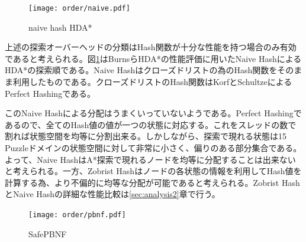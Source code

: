 \documentclass[uplatex]{jsarticle}
\begin{document}
\begin{figure}
	\centering
	\texttt{[image: order/naive.pdf]}
	\caption{naive hash HDA*}
	\label{fig:order_naive_hash}
\end{figure}
上述の探索オーバーヘッドの分類はHash関数が十分な性能を持つ場合のみ有効であると考えられる。図\ref{fig:order_naive_hash}はBurnsらHDA*の性能評価に用いたNaive HashによるHDA*の探索順である。Naive Hashはクローズドリストの為のHash関数をそのまま利用したものである。クローズドリストのHash関数はKorfとSchultzeによるPerfect Hashingである\cite{korf2005large}。

このNaive Hashによる分配はうまくいっていないようである。Perfect Hashingであるので、全てのHash値の値が一つの状態に対応する。これをスレッドの数で割れば状態空間を均等に分割出来る。しかしながら、探索で現れる状態は15 Puzzleドメインの状態空間に対して非常に小さく、偏りのある部分集合である。よって、Naive HashはA*探索で現れるノードを均等に分配することは出来ないと考えられる。一方、Zobrist Hashはノードの各状態の情報を利用してHash値を計算する為、より不偏的に均等な分配が可能であると考えられる。Zobrist HashとNaive Hashの詳細な性能比較は\ref{sec:analysis2}章で行う。

\begin{figure}
	\centering
	\texttt{[image: order/pbnf.pdf]}
	\caption{SafePBNF}
	\label{fig:order_safepbnf}
\end{figure}
\end{document}
